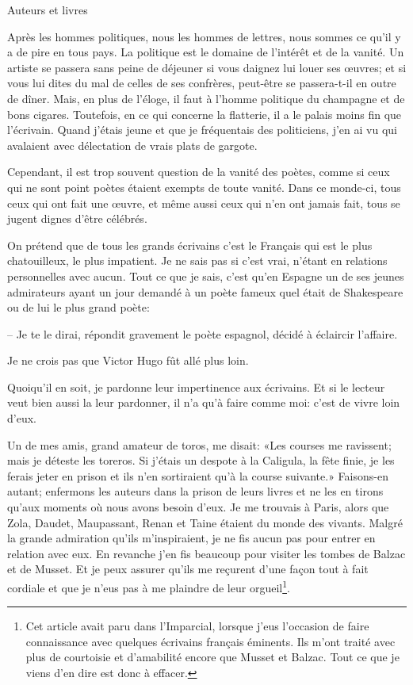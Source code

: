 \begin{chapter}{Auteurs et livres}

Après les hommes politiques, nous les hommes de lettres, nous sommes ce
qu'il y a de pire en tous pays. La politique est le domaine de l'intérêt
et de la vanité. Un artiste se passera sans peine de déjeuner si vous
daignez lui louer ses œuvres; et si vous lui dites du mal de celles
de ses confrères, peut-être se passera-t-il en outre de dîner. Mais, en
plus de l'éloge, il faut à l'homme politique du champagne et de bons
cigares. Toutefois, en ce qui concerne la flatterie, il a le palais
moins fin que l'écrivain. Quand j'étais jeune et que je fréquentais des
politiciens, j'en ai vu qui avalaient avec délectation de vrais plats
de gargote.

Cependant, il est trop souvent question de la vanité des poètes, comme
si ceux qui ne sont point poètes étaient exempts de toute vanité. Dans
ce monde-ci, tous ceux qui ont fait une œuvre, et même aussi ceux qui
n'en ont jamais fait, tous se jugent dignes d'être célébrés.

On prétend que de tous les grands écrivains c'est le Français qui est le
plus chatouilleux, le plus impatient. Je ne sais pas si c'est vrai,
n'étant en relations personnelles avec aucun. Tout ce que je sais, c'est
qu'en Espagne un de ses jeunes admirateurs ayant un jour demandé à un
poète fameux quel était de Shakespeare ou de lui le plus grand poète:

-- Je te le dirai, répondit gravement le poète espagnol, décidé à
éclaircir l'affaire.

Je ne crois pas que Victor Hugo fût allé plus loin.

Quoiqu'il en soit, je pardonne leur impertinence aux écrivains. Et si le
lecteur veut bien aussi la leur pardonner, il n'a qu'à faire comme moi:
c'est de vivre loin d'eux.

Un de mes amis, grand amateur de toros, me disait: «Les courses me
ravissent; mais je déteste les toreros. Si j'étais un despote à la
Caligula, la fête finie, je les ferais jeter en prison et ils n'en
sortiraient qu'à la course suivante.» Faisons-en autant; enfermons les
auteurs dans la prison de leurs livres et ne les en tirons qu'aux
moments où nous avons besoin d'eux. Je me trouvais à Paris, alors que
Zola, Daudet, Maupassant, Renan et Taine étaient du monde des vivants.
Malgré la grande admiration qu'ils m'inspiraient, je ne fis aucun pas
pour entrer en relation avec eux. En revanche j'en fis beaucoup pour
visiter les tombes de Balzac et de Musset. Et je peux assurer qu'ils me
reçurent d'une façon tout à fait cordiale et que je n'eus pas à me
plaindre de leur orgueil\footnote{Cet article avait paru dans l'Imparcial,
lorsque j'eus l'occasion de faire connaissance avec quelques
écrivains français éminents. Ils m'ont traité avec plus de courtoisie et
d'amabilité encore que Musset et Balzac. Tout ce que je viens d'en dire est
donc à effacer.}.


\end{chapter}
